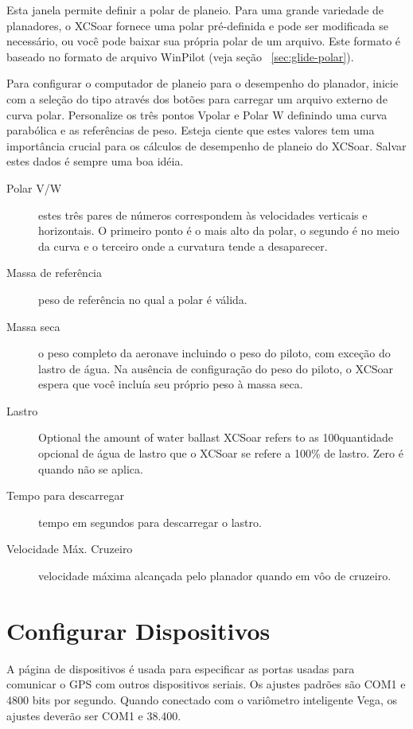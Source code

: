 Esta janela permite definir a polar de planeio.  Para uma grande variedade 
de planadores, o XCSoar fornece uma polar pré-definida e pode ser modificada se necessário, ou você pode baixar sua própria polar de um arquivo.  Este formato é baseado no formato de arquivo WinPilot (veja seção ~\ref{sec:glide-polar}).

\label{conf:polar} Para configurar o computador de planeio para o desempenho do planador, inicie com a seleção do tipo através dos botões     para carregar um arquivo externo de curva polar.
Personalize os três pontos Vpolar e Polar W definindo uma curva parabólica e as referências de peso.  Esteja ciente que estes valores tem uma importância crucial para os cálculos de desempenho de planeio do XCSoar.  \tip Salvar estes dados é sempre uma boa idéia.

\begin{description}
\item[Polar V/W]  estes três pares de números correspondem às velocidades verticais e horizontais.  O primeiro ponto é o mais alto da polar, o segundo é no meio da curva e o terceiro onde a curvatura tende a desaparecer.
\item[Massa de referência]  peso de referência no qual a polar é válida.
\item[Massa seca]  o peso completo da aeronave incluindo o peso do piloto, com exceção do lastro de água.  Na ausência de configuração do peso do piloto, o XCSoar espera que você incluía seu próprio peso à massa seca.
\item[Lastro]  Optional the amount of water ballast XCSoar refers to as 100quantidade opcional de água de lastro que o XCSoar se refere a 100\% de lastro.  Zero é quando não se aplica.
\item[Tempo para descarregar]  tempo em segundos para descarregar o lastro.
\item[Velocidade Máx. Cruzeiro] velocidade máxima alcançada pelo planador quando em vôo de cruzeiro.
\end{description}


\section{Configurar Dispositivos} \label{conf:comdevices}

A página de dispositivos é usada para especificar as portas usadas para 
comunicar o GPS com outros dispositivos seriais.  Os ajustes padrões são COM1 e 4800 bits por segundo.  Quando conectado com o variômetro inteligente Vega, os ajustes deverão ser COM1 e 38.400.


